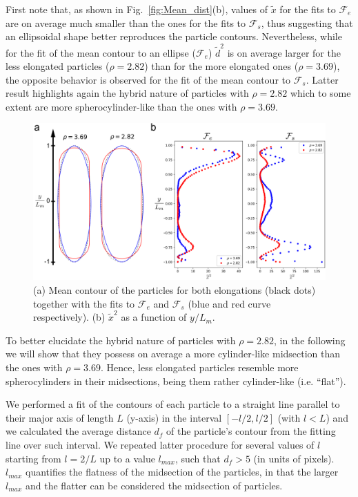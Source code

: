 \documentclass[aip,graphicx]{revtex4-1} %
\begin{document}
First note that, as shown in Fig.~\ref{fig:Mean_dist}(b), values of $\widetilde{x}$ for the fits to $\mathcal{F}_e$ 
are on average much smaller than the ones for the fits to $\mathcal{F}_s$, thus suggesting that an ellipsoidal shape better reproduces
the particle contours. Nevertheless, while for the fit of the mean contour to an ellipse ($\mathcal{F}_e$) $\widetilde{d}^2$ 
is on average larger for the less elongated particles ($\rho=2.82$) than for the more elongated ones ($\rho=3.69$), 
the opposite behavior is observed for the fit of the mean contour
to $\mathcal{F}_s$. Latter result highlights again the hybrid nature of particles with $\rho=2.82$ which to some extent are more
spherocylinder-like than the ones with $\rho=3.69$.

\begin{figure}
    \centering
    \includegraphics[width=0.7\columnwidth]{Mean_bord.png}
\caption{(a) Mean contour of the particles for both elongations (black dots) together with the fits to $\mathcal{F}_e$ and 
$\mathcal{F}_s$ (blue and red curve respectively). (b) $\widetilde{x}^2$ as a function of $y/L_m$.}\label{fig:Mean_bord}
\end{figure}

To better elucidate the hybrid nature of particles with $\rho=2.82$, in the following we will show that they
possess on average a more cylinder-like midsection than the ones with $\rho=3.69$. 
Hence, less elongated particles resemble more spherocylinders in their midsections, being them rather cylinder-like (i.e. ``flat'').

We performed a fit of the contours of each particle to a straight line parallel to their major axis of length $L$ (y-axis)
in the interval $[-l/2, l/2]$ (with $l < L$) and we calculated the average distance $d_f$ of
the particle's contour from the fitting line over such interval. 
We repeated latter procedure for several values of $l$ starting from $l=2/L$ up to a value $l_{max}$, such that
$d_f > 5$ (in units of pixels). $l_{max}$ quantifies the flatness of the midsection of the particles, in that 
the larger $l_{max}$ and the flatter can be considered the midsection of particles.
\end{document}
